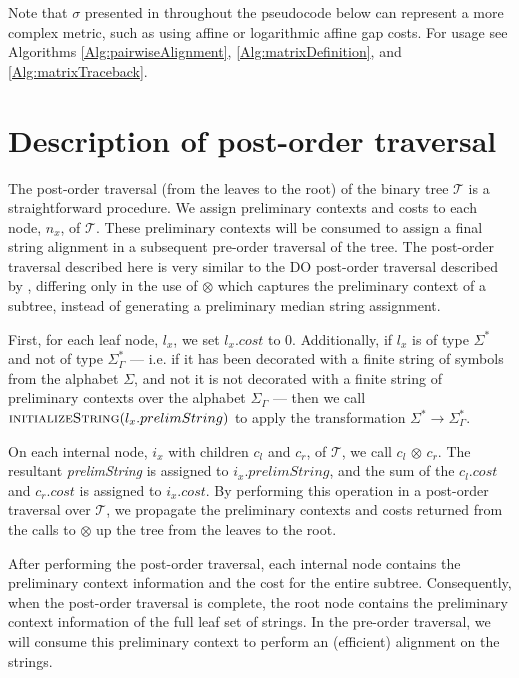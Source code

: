 \documentclass{bmcart}
\begin{document}
Note that $\sigma$ presented in throughout the pseudocode below can represent a more complex metric, such as using affine or logarithmic affine gap costs. For usage see Algorithms \ref{Alg:pairwiseAlignment},  \ref{Alg:matrixDefinition}, and \ref{Alg:matrixTraceback}.


\section*{Description of post-order traversal}
The post-order traversal (from the leaves to the root) of the binary tree $\mathcal{T}$ is a straightforward procedure.
We assign preliminary contexts and costs to each node, $n_x$, of $\mathcal{T}$.
These preliminary contexts will be consumed to assign a final string alignment in a subsequent pre-order traversal of the tree.
The post-order traversal described here is very similar to the DO post-order traversal described by \cite{Wheeler2003}, differing only in the use of $\otimes$ which captures the preliminary context of a subtree, instead of generating a preliminary median string assignment.

First, for each leaf node, $l_x$, we set $l_x.cost$ to $0$.
Additionally, if $l_x$ is of type $\Sigma^{*}$ and not of type $\Sigma^{*}_{\Gamma}$ --- i.e. if it has been decorated with a finite string of symbols from the alphabet $\Sigma$, and not it is not decorated with a finite string of preliminary contexts over the alphabet $\Sigma_{\Gamma}$ --- then we call $\Call{initializeString}{l_x.prelimString}$ to apply the transformation $\Sigma^{*} \rightarrow \Sigma^{*}_{\Gamma}$.

On each internal node, $i_x$ with children $c_l$ and $c_r$, of $\mathcal{T}$, we call $c_l$ $\otimes$ $c_r$.
The resultant \textit{prelimString} is assigned to $i_x.prelimString$, and the sum of the $c_l.cost$ and $c_r.cost$ is assigned to $i_x.cost$.
By performing this operation in a post-order traversal over $\mathcal{T}$, we propagate the preliminary contexts and costs returned from the calls to $\otimes$ up the tree from the leaves to the root.

After performing the post-order traversal, each internal node contains the preliminary context information and the cost for the entire subtree.
Consequently, when the post-order traversal is complete, the root node contains the preliminary context information of the full leaf set of strings.
In the pre-order traversal, we will consume this preliminary context to perform an (efficient) alignment on the strings.
\end{document}
